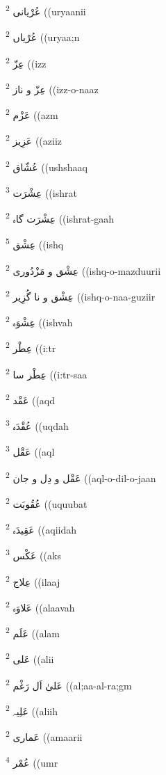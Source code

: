 \documentclass[12pt]{article}
\begin{document}
\begin{multicols}{5}
{\ur عُرْیانی}   \textsuperscript{2} ((uryaanii

{\ur عُرْیاں}   \textsuperscript{2} ((uryaa;n

{\ur عِزّ}   \textsuperscript{2} ((izz

{\ur عِزّ و ناز}   \textsuperscript{2} ((izz-o-naaz

{\ur عَزْم}   \textsuperscript{2} ((azm

{\ur عَزِیز}   \textsuperscript{2} ((aziiz

{\ur عُشّاق}   \textsuperscript{2} ((ushshaaq

{\ur عِشْرَت}   \textsuperscript{3} ((ishrat

{\ur عِشْرَت گاہ}   \textsuperscript{2} ((ishrat-gaah

{\ur عِشْق}   \textsuperscript{5} ((ishq

{\ur عِشْق و مَزْدُوری}   \textsuperscript{2} ((ishq-o-mazduurii

{\ur عِشْق و نا گُزِیر}   \textsuperscript{2} ((ishq-o-naa-guziir

{\ur عِشْوَہ}   \textsuperscript{2} ((ishvah

{\ur عِطْر}   \textsuperscript{2} ((i:tr

{\ur عِطْر سا}   \textsuperscript{2} ((i:tr-saa

{\ur عَقْد}   \textsuperscript{2} ((aqd

{\ur عُقْدَہ}   \textsuperscript{3} ((uqdah

{\ur عَقْل}   \textsuperscript{3} ((aql

{\ur عَقْل و دِل و جان}   \textsuperscript{2} ((aql-o-dil-o-jaan

{\ur عُقُوبَت}   \textsuperscript{2} ((uquubat

{\ur عَقِیدَہ}   \textsuperscript{2} ((aqiidah

{\ur عَکْس}   \textsuperscript{3} ((aks

{\ur عِلاج}   \textsuperscript{2} ((ilaaj

{\ur عَلاوَہ}   \textsuperscript{2} ((alaavah

{\ur عَلَم}   \textsuperscript{2} ((alam

{\ur عَلی}   \textsuperscript{2} ((alii

{\ur عَلیٰ اَل رَغْم}   \textsuperscript{2} ((al;aa-al-ra;gm

{\ur عَلِیہ}   \textsuperscript{2} ((aliih

{\ur عَماری}   \textsuperscript{2} ((amaarii

{\ur عُمْر}   \textsuperscript{4} ((umr


\end{multicols}
\end{document}
